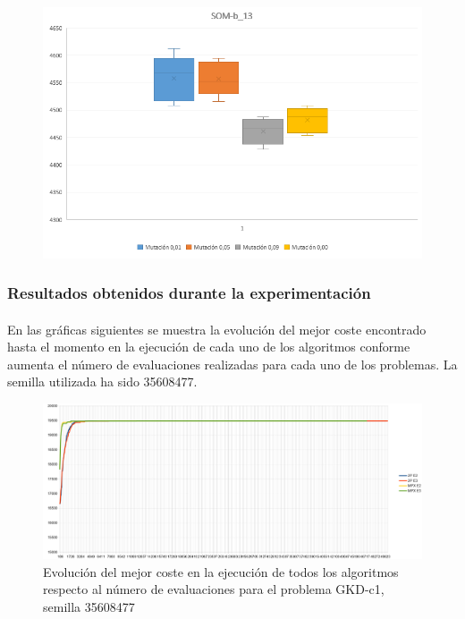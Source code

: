 	\begin{figure}[H]
		
		\centering
		\includegraphics[scale=0.65]{img/BigotesMutacion0SOM_3}
		
	\end{figure}

	\subsubsection{Resultados obtenidos durante la experimentación}

	\paragraph{} En las gráficas siguientes se muestra la evolución del mejor coste encontrado hasta el momento en la ejecución de cada uno de los algoritmos conforme aumenta el número de evaluaciones realizadas para cada uno de los problemas. La semilla utilizada ha sido 35608477.

	\begin{figure}[H]
		\centering
		\includegraphics[scale=0.3]{img/35608477_GKD-c_1_n500_m50.png}
		\caption{Evolución del mejor coste en la ejecución de todos los algoritmos respecto al número de evaluaciones para el problema GKD-c1, semilla 35608477}
		\label{gkd-c1_historico}
	\end{figure}

